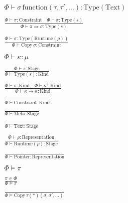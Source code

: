 \documentclass {article}
\begin{document}
\begin{gather*}
{\Phi \vdash \sigma \, \text{function} (\tau, \tau', \dots) : \text{Type} (\text{Text})} \\
\\
\frac
{\Phi \vdash \pi : \text{Constraint} \quad \Phi \vdash \sigma : \text{Type}(s)}
{\Phi \vdash \pi \Rightarrow \sigma : \text{Type}(s)} \\
\\
\frac
{\Phi \vdash \sigma : \text{Type}(\text{Runtime}(\rho))}
{\Phi \vdash \text{Copy} \, \sigma : \text{Constraint}} \\
\\
\Phi \vdash \kappa : \mu \tag*{[Kind Validation]} \\
\\
\frac
{\Phi \vdash s : \text{Stage}}
{\Phi \vdash \text {Type} (s) : \text{Kind}} \\
\\
\frac
{\Phi \vdash \kappa : \text{Kind} \quad \Phi \vdash \kappa' : \text{Kind}}
{\Phi \vdash \kappa \to \kappa : \text{Kind} } \\
\\
\frac
{}
{\Phi \vdash \text{Constraint} : \text{Kind}} \\
\\
\frac
{}
{\Phi \vdash \text{Meta} : \text{Stage}} \\
\\
\frac
{}
{\Phi \vdash \text{Text} : \text{Stage}} \\
\\
\frac
{\Phi \vdash \rho : \text{Representation}}
{\Phi \vdash \text{Runtime} (\rho) : \text{Stage}} \\
\\
\frac
{}
{\Phi \vdash \text{Pointer} : \text{Representation}} \\
\\
\Phi \models \pi \tag*{[Qualified Validation]} \\
\\
\frac
{\pi \in \Phi}
{\Phi \models \pi} \\
\\
\frac
{}
{\Phi \models \text{Copy} \, \tau(*)(\sigma, \sigma', \dots)}
\end{gather*}
\end{document}
